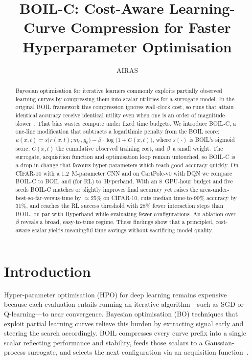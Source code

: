 \documentclass{article} %
\title{BOIL-C: Cost-Aware Learning-Curve Compression for Faster Hyperparameter Optimisation\@}
\author{AIRAS}
\begin{document}
\maketitle

\begin{abstract}
Bayesian optimisation for iterative learners commonly exploits partially observed learning curves by compressing them into scalar utilities for a surrogate model. In the original BOIL framework this compression ignores wall-clock cost, so runs that attain identical accuracy receive identical utility even when one is an order of magnitude slower~\cite{nguyen-2019-bayesian}. That bias wastes compute under fixed time budgets. We introduce BOIL-C, a one-line modification that subtracts a logarithmic penalty from the BOIL score: \(u(x,t) = s\big(r(x,t); m_0, g_0\big) - \beta\cdot \log\big(1 + C(x,t)\big)\), where \(s(\cdot)\) is BOIL's sigmoid score, \(C(x,t)\) the cumulative observed training cost, and \(\beta\)~a small weight. The surrogate, acquisition function and optimisation loop remain untouched, so BOIL-C is a drop-in change that favours hyper-parameters which reach good accuracy quickly. On CIFAR-10 with a 1.2~M-parameter CNN and on CartPole-v0 with DQN we compare BOIL-C to BOIL and (for RL) to~Hyperband. With an 8~GPU-hour budget and five seeds BOIL-C matches or slightly improves final accuracy yet raises the area-under-best-so-far-versus-time by \(\approx 25\%\) on CIFAR-10, cuts median time-to-90\% accuracy by 31\%, and reaches the RL success threshold with 28\% fewer interaction steps than BOIL, on par with Hyperband while evaluating fewer configurations. An ablation over \(\beta\) reveals a broad, easy-to-tune regime. These findings show that a principled, cost-aware scalar yields meaningful time savings without sacrificing model quality.
\end{abstract}

\section{Introduction}
\label{sec:intro}%
%
Hyper-parameter optimisation (HPO) for deep learning remains expensive because each evaluation entails running an iterative algorithm---such as SGD or Q-learning---to near convergence. Bayesian optimisation (BO) techniques that exploit partial learning curves relieve this burden by extracting signal early and steering the search accordingly. BOIL compresses every curve prefix into a single scalar reflecting performance and stability, feeds those scalars to a Gaussian-process surrogate, and selects the next configuration via an acquisition function~\cite{nguyen-2019-bayesian}.
\end{document}
